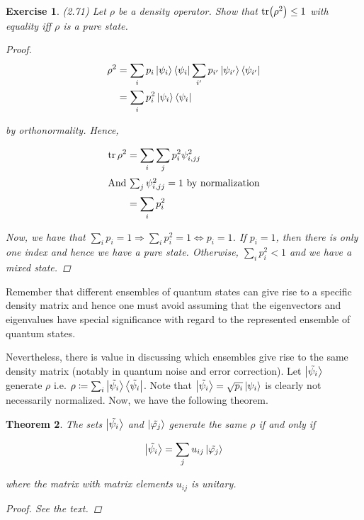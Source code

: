 \documentclass[11pt]{article}
\newcommand\0{\mathbf{0}}
\newcommand\<{\langle}
\renewcommand\>{\rangle}
\renewcommand\iff{\Leftrightarrow}
\renewcommand\phi{\varphi}
\renewcommand\implies{\Rightarrow}
\newtheorem{theorem}{Theorem}[section]
\newtheorem{exercise}[theorem]{Exercise}
\begin{document}
\begin{exercise}
(2.71) Let $\rho$ be a density operator. Show that $\tr(\rho^2) \leq 1$ with equality iff $\rho$ is a pure state.
\begin{proof}
\begin{align*}
\rho^2 &= \sum_i p_i \ket{\psi_i}\bra{\psi_i}	\sum_{i'} p_{i'} \ket{\psi_{i'}}\bra{\psi_{i'}}	\\
&= 	\sum_i p_i^2 \ket{\psi_i}\bra{\psi_i}
\end{align*}

by orthonormality. Hence,

\begin{align*}
\tr \rho^2 &= \sum_i \sum_j p_i^2 \psi_{i,jj}^2 \\
\intertext{And $\sum_j \psi_{i,jj}^2=1$ by normalization}
&= \sum_i p_i^2
\end{align*}

Now, we have that $\sum_i p_i = 1 \implies \sum_i p_i^2 = 1 \iff p_i = 1$. If $p_i = 1$, then there is only one index and hence we have a pure state. Otherwise, $\sum_i p_i^2 < 1$ and we have a mixed state.
\end{proof}	
\end{exercise}

Remember that different ensembles of quantum states can give rise to a specific density matrix and hence one must avoid assuming that the eigenvectors and eigenvalues have special significance with regard to the represented ensemble of quantum states.

Nevertheless, there is value in discussing which ensembles give rise to the same density matrix (notably in quantum noise and error correction). Let $\ket{\tilde{\psi_i}}$ generate $\rho$ i.e. $\rho\coloneqq\sum_i\ket{\tilde{\psi_i}}\bra{\tilde{\psi_i}}$. Note that $\ket{\tilde{\psi_i}} = \sqrt{p_i}\ket{\psi_i}$ is clearly not necessarily normalized. Now, we have the following theorem.

\begin{theorem}
The sets $\ket{\tilde{\psi_i}}$ and $\ket{\tilde{\phi_j}}$ generate the same $\rho$ if and only if

\begin{align*}
	\ket{\tilde{\psi_i}} = \sum_j u_{ij}\ket{\tilde{\phi_j}}
\end{align*}

where the matrix with matrix elements $u_{ij}$ is unitary.
\begin{proof}
	See the text.
\end{proof}
\end{theorem}
\end{document}
